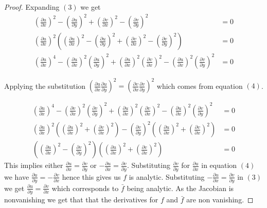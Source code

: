 \documentclass[letter,12pt,reqno]{article}
\begin{document}
\begin{proof}
        Expanding $(3)$ we get 
        \begin{align*}
        (\frac{\partial u}{\partial x})^2- (\frac{\partial u}{\partial y})^2 + (\frac{\partial v}{\partial x})^2-(\frac{\partial v}{\partial y})^2&=0\\
        \left(\frac{\partial u}{\partial x}\right)^2\left(        (\frac{\partial u}{\partial x})^2- (\frac{\partial u}{\partial y})^2 + (\frac{\partial v}{\partial x})^2-(\frac{\partial v}{\partial y})^2\right)&=0            
        \\
        (\frac{\partial u}{\partial x})^4- (\frac{\partial u}{\partial x})^2(\frac{\partial u}{\partial y})^2+(\frac{\partial u}{\partial x})^2(\frac{\partial v}{\partial x})^2-(\frac{\partial u}{\partial x})^2(\frac{\partial v}{\partial y})^2& =0
        \end{align*}

        Applying the substitution $(\frac{\partial u}{\partial x}\frac{\partial u}{\partial y})^2=(\frac{\partial v}{\partial x}\frac{\partial v}{\partial y})^2$ which comes from equation $(4)$.

        \begin{align*}
            (\frac{\partial u}{\partial x})^4- (\frac{\partial v}{\partial x})^2(\frac{\partial v}{\partial y})^2+(\frac{\partial u}{\partial x})^2(\frac{\partial v}{\partial x})^2-(\frac{\partial u}{\partial x})^2(\frac{\partial v}{\partial y})^2& =0\\
            (\frac{\partial u}{\partial x})^2\left((\frac{\partial u}{\partial x})^2 +(\frac{\partial v}{\partial x})^2\right)-(\frac{\partial v}{\partial y})^2\left((\frac{\partial u}{\partial x })^2+ (\frac{\partial v}{\partial x})^2 \right)&=0\\
            \left((\frac{\partial u}{\partial x})^2 -(\frac{\partial v}{\partial y})^2\right)\left((\frac{\partial u}{\partial x})^2 +(\frac{\partial v}{\partial x})^2\right) & = 0
        \end{align*}
        This implies either $\frac{\partial u}{\partial x}=\frac{\partial v}{\partial y}$  or $-\frac{\partial u}{\partial x}=\frac{\partial v}{\partial y}$. Substituting $\frac{\partial v}{\partial y}$ for $\frac{\partial u}{\partial x}$ in equation $(4)$ we have $\frac{\partial u}{\partial y}=-\frac{\partial v}{\partial x}$ hence this gives us $f$ is analytic. Substituting $-\frac{\partial u}{\partial x}=\frac{\partial v}{\partial y}$ in $(3)$ we get $\frac{\partial u}{\partial y}=\frac{\partial v}{\partial x}$ which corresponds to $\bar f$ being analytic. As the Jacobian is nonvanishing we get that that the derivatives for $f$ and $\bar f$ are non vanishing. 

    \end{proof}
\end{document}

